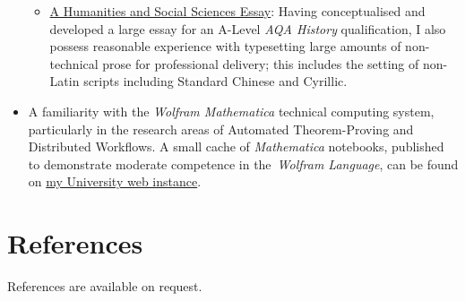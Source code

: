 \documentclass{article}
\newcommand{\githublink}[2]{\href{https://github.com/oliverdixon/#1}{#2}}
\newcommand{\weblink}[2]{\href{https://www-users.york.ac.uk/~od641/#1}{#2}}
\begin{document}
\begin{itemize}
\begin{itemize}
                \item \githublink{opium}{A Humanities and Social Sciences
                Essay}: Having conceptualised and developed a large essay for an
                A-Level \textit{AQA History} qualification, I also possess
                reasonable experience with typesetting large amounts of
                non-technical prose for professional delivery; this includes the
                setting of non-Latin scripts including Standard Chinese and
                Cyrillic.
        \end{itemize}
        \item A familiarity with the \textit{Wolfram Mathematica} technical
        computing system, particularly in the research areas of Automated
        Theorem-Proving and Distributed Workflows. A small cache of
        \textit{Mathematica} notebooks, published to demonstrate moderate
        competence in the~\textit{Wolfram Language}, can be found on
        \weblink{misc\_mma}{my University web instance}.
\end{itemize}
%
%
\section{References}
References are available on request.
%
\end{document}

